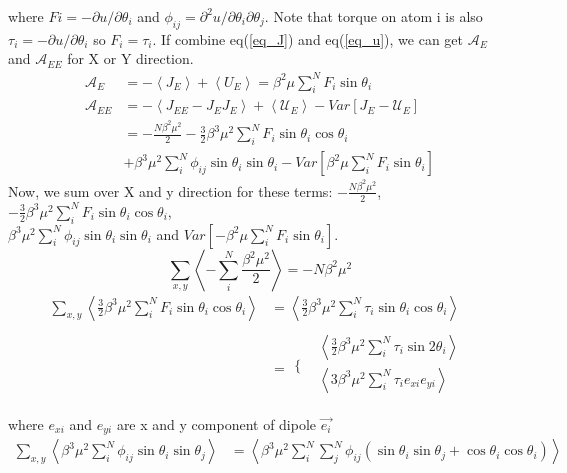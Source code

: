 \documentclass[11pt,reqno]{amsart}
\begin{document}
where $Fi=-\partial u/\partial \theta_i$ and $\phi_{ij} = \partial^2 u/\partial\theta_i\partial\theta_j$. Note that torque on atom i is also $\tau_i=-\partial u/\partial \theta_i$ so $F_i= \tau_i$. If combine eq({\ref{eq_J}) and eq(\ref{eq_u}), we can get $\mathcal{A}_E$ and $\mathcal{A}_{EE}$ for X or Y direction. 
\begin{align}
\mathcal{A}_{E}&=  -\left< J_E \right> + \left< U_E \right> 
=  \beta ^2 \mu \sum_i^N  F_i   \sin\theta_i \nonumber \\
\mathcal{A}_{EE} &= -\left<J_{EE}-J_E J_E\right> + \left<\mathcal{U}_E\right> - Var[J_E - \mathcal{U}_E] \nonumber \\
&=-\frac{N\beta ^2 \mu ^2}{2}-\frac{3}{2}  \beta ^3\mu ^2 \sum_i^N F_i \sin\theta_i \cos\theta_i\nonumber \\
&+\beta ^3 \mu ^2 \sum_i^N \phi_{ij}  \sin\theta_i \sin\theta_i - Var\left[ \beta ^2 \mu \sum_i^N F_i   \sin\theta_i\right]
\end{align}
Now, we sum over X and y direction for these terms: $-\frac{N\beta ^2 \mu ^2}{2}$,$-\frac{3}{2}  \beta ^3\mu ^2 \sum_i^N F_i \sin\theta_i \cos\theta_i$,\\$\beta ^3 \mu ^2 \sum_i^N \phi_{ij}  \sin\theta_i \sin\theta_i$ and $Var\left[- \beta ^2 \mu \sum_i^N F_i   \sin\theta_i\right]$.
\begin{equation}
\label{eq:constant}
\sum_{x,y}\left<-\sum_i^N\frac{\beta ^2 \mu ^2}{2}\right>= -N\beta ^2 \mu ^2
\end{equation}
\begin{align}
\label{eq:Fexey}
\sum_{x,y}\left<\frac{3}{2}  \beta ^3\mu ^2 \sum_i^N F_i \sin\theta_i \cos\theta_i\right> &= \left<\frac{3}{2} \beta ^3\mu ^2 \sum_i^N \tau_i\sin\theta_i\cos\theta_i\right> \nonumber \\
&= \begin{array}{cc}
 \{ & 
\begin{array}{cc}
 \left<\frac{3}{2} \beta ^3\mu ^2 \sum_i^N \tau_i\sin{2\theta_i}\right>  \\
 \left< 3 \beta ^3\mu ^2 \sum_i^N \tau_i e_{xi} e_{yi}\right>  \\
\end{array}
 \\
\end{array}
\end{align}
where $e_{xi}$ and $e_{yi}$ are x and y component of dipole $\overset{\to}{e_i}$
\begin{align}
\label{eq:phi}
\sum_{x,y}\left<\beta ^3 \mu ^2\sum_i^N  \phi_{ij}\sin\theta_i\sin\theta_j\right>&=\left<\beta ^3 \mu ^2\sum_i^N \sum_j^N \phi_{ij}(\sin\theta_i\sin\theta_j+\cos\theta_i\cos\theta_i)\right> \nonumber \\

\end{align}}
\end{document}
